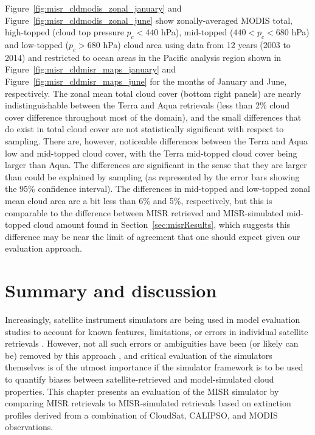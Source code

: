 Figure~\ref{fig:misr_cldmodis_zonal_january} and
Figure~\ref{fig:misr_cldmodis_zonal_june} show zonally-averaged MODIS
total, high-topped (cloud top pressure \(p_c < 440\) hPa), mid-topped
(\(440 < p_c < 680\) hPa) and low-topped (\(p_c > 680\) hPa) cloud area
using data from 12 years (2003 to 2014) and restricted to ocean areas in
the Pacific analysis region shown in
Figure~\ref{fig:misr_cldmisr_maps_january} and
Figure~\ref{fig:misr_cldmisr_maps_june} for the months of January and
June, respectively. The zonal mean total cloud cover (bottom right
panels) are nearly indistinguishable between the Terra and Aqua
retrievals (less than 2\% cloud cover difference throughout most of the
domain), and the small differences that do exist in total cloud cover
are not statistically significant with respect to sampling. There are,
however, noticeable differences between the Terra and Aqua low and
mid-topped cloud cover, with the Terra mid-topped cloud cover being
larger than Aqua. The differences are significant in the sense that they
are larger than could be explained by sampling (as represented by the
error bars showing the 95\% confidence interval). The differences in
mid-topped and low-topped zonal mean cloud area are a bit less than 6\%
and 5\%, respectively, but this is comparable to the difference between
MISR retrieved and MISR-simulated mid-topped cloud amount found in
Section~\ref{sec:misrResults}, which suggests this difference may be
near the limit of agreement that one should expect given our evaluation
approach.

\section{Summary and discussion}\label{sec:misrSummary}

Increasingly, satellite instrument simulators are being used in model
evaluation studies to account for known features, limitations, or errors
in individual satellite retrievals \citep{webb_et_al_2016}. However, not
all such errors or ambiguities have been (or likely can be) removed by
this approach \citep{pincus_et_al_2012, mace_et_al_2011}, and critical
evaluation of the simulators themselves is of the utmost importance if
the simulator framework is to be used to quantify biases between
satellite-retrieved and model-simulated cloud properties. This chapter
presents an evaluation of the MISR simulator by comparing MISR
retrievals to MISR-simulated retrievals based on extinction profiles
derived from a combination of CloudSat, CALIPSO, and MODIS observations.

